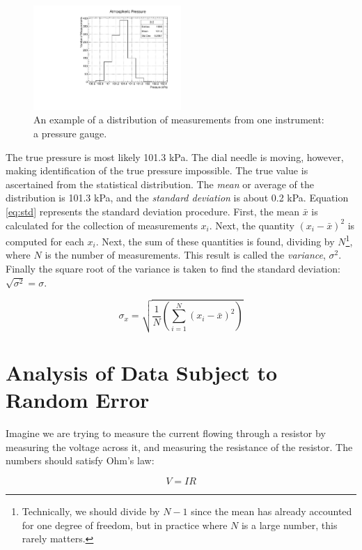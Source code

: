 \documentclass[12pt]{article}
\begin{document}
\begin{figure}
\centering
\includegraphics[angle=270,width=0.5\textwidth]{figures/histo.pdf}
\caption{\label{fig:histo} An example of a distribution of measurements from one instrument: a pressure gauge.}
\end{figure}

The true pressure is most likely 101.3 kPa.  The dial needle is moving, however, making identification of the true pressure impossible.  The true value is ascertained from the statistical distribution.  The \textit{mean} or average of the distribution is 101.3 kPa, and the \textit{standard deviation} is about 0.2 kPa.  Equation \ref{eq:std} represents the standard deviation procedure.  First, the mean $\bar{x}$ is calculated for the collection of measurements $x_i$.  Next, the quantity $(x_i - \bar{x})^2$ is computed for each $x_i$.  Next, the sum of these quantities is found, dividing by $N$\footnote{Technically, we should divide by $N-1$ since the mean has already accounted for one degree of freedom, but in practice where $N$ is a large number, this rarely matters.}, where $N$ is the number of measurements.  This result is called the \textit{variance}, $\sigma^2$.  Finally the square root of the variance is taken to find the standard deviation: $\sqrt{\sigma^2} = \sigma$.

\begin{equation}
\sigma_x = \sqrt{\frac{1}{N} \left( \sum_{i=1}^N (x_i - \bar{x})^2\right)} \label{eq:std}
\end{equation}

\section{Analysis of Data Subject to Random Error}

Imagine we are trying to measure the current flowing through a resistor by measuring the voltage across it, and measuring the resistance of the resistor.  The numbers should satisfy Ohm's law:

\begin{equation}
V = IR
\end{equation}
\end{document}
